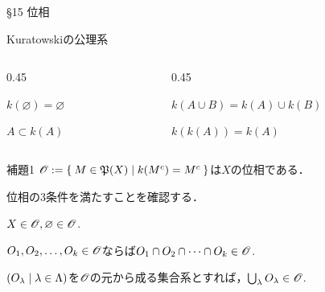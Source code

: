 \documentclass[uplatex,a4paper,dvipdfmx,aspectratio=169,11pt]{beamer}
\begin{document}
\begin{frame}[fragile]{\S 15 位相}
    \begin{block}{Kuratowskiの公理系}
        \vspace{-0.5em}
        \begin{columns}
            \begin{column}{0.45\textwidth}
                \begin{description}[$\textbf{K}_1$:]
                    \item[$\textbf{K}_1$:] $k(\varnothing) = \varnothing$
                    \item[$\textbf{K}_2$:] $A \subset k(A)$
                \end{description}
            \end{column}
            \begin{column}{0.45\textwidth}
                \begin{description}[$\textbf{K}_1$:]
                    \item[$\textbf{K}_3$:] $k(A \cup B) = k(A) \cup k(B)$
                    \item[$\textbf{K}_4$:] $k(k(A)) = k(A)$
                \end{description}
            \end{column}
        \end{columns}
    \end{block}

    \begin{block}{補題1}
        $\mathscr{O} := \Set{ M \in {\mathord{\mathfrak{P}}\qty(X)} | k(M^c) = M^c}$は$X$の位相である．
    \end{block}

    \medskip{}
    位相の3条件を満たすことを確認する．
    \begin{block}{}
        \begin{description}[$\textbf{O}_1$]
            \item[$\textbf{O}_1$] $X \in \mathscr{O}, \varnothing \in \mathscr{O}$.
            \item[$\textbf{O}_2$] $O_1, O_2, \ldots, O_k \in \mathscr{O}$ならば$O_1 \cap O_2 \cap \dots \cap O_k \in \mathscr{O}$.
            \item[$\textbf{O}_3$] $\qty(O_\lambda \mid \lambda \in \Lambda)$を$\mathscr{O}$の元から成る集合系とすれば，$\bigcup_\lambda O_\lambda \in \mathscr{O}$.
        \end{description}
    \end{block}
\end{frame}
\end{document}
